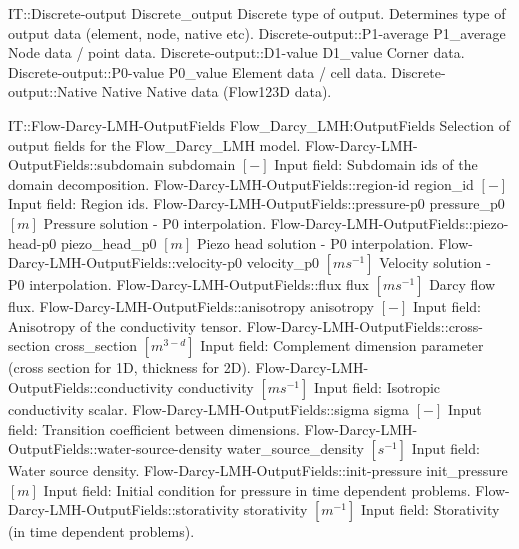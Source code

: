 \begin{SelectionType}
	{IT::Discrete-output}
	{Discrete{\_}output}
	{{{Discrete type of output.
Determines type of output data (element, node, native etc).}%
}}
		\SelectionItem
			{Discrete-output::P1-average}
			{P1{\_}average}
			{{{Node data / point data.}%
}}
		\SelectionItem
			{Discrete-output::D1-value}
			{D1{\_}value}
			{{{Corner data.}%
}}
		\SelectionItem
			{Discrete-output::P0-value}
			{P0{\_}value}
			{{{Element data / cell data.}%
}}
		\SelectionItem
			{Discrete-output::Native}
			{Native}
			{{{Native data (Flow123D data).}%
}}
\end{SelectionType}
\begin{SelectionType}
	{IT::Flow-Darcy-LMH-OutputFields}
	{Flow{\_}Darcy{\_}LMH:OutputFields}
	{{{Selection of output fields for the Flow{\_}Darcy{\_}LMH model.}%
}}
		\SelectionItem
			{Flow-Darcy-LMH-OutputFields::subdomain}
			{subdomain}
			{{{}{$[-]$}{ Input field: Subdomain ids of the domain decomposition.}%
}}
		\SelectionItem
			{Flow-Darcy-LMH-OutputFields::region-id}
			{region{\_}id}
			{{{}{$[-]$}{ Input field: Region ids.}%
}}
		\SelectionItem
			{Flow-Darcy-LMH-OutputFields::pressure-p0}
			{pressure{\_}p0}
			{{{}{$[m]$}{ Pressure solution - P0 interpolation.}%
}}
		\SelectionItem
			{Flow-Darcy-LMH-OutputFields::piezo-head-p0}
			{piezo{\_}head{\_}p0}
			{{{}{$[m]$}{ Piezo head solution - P0 interpolation.}%
}}
		\SelectionItem
			{Flow-Darcy-LMH-OutputFields::velocity-p0}
			{velocity{\_}p0}
			{{{}{$[ms^{-1}]$}{ Velocity solution - P0 interpolation.}%
}}
		\SelectionItem
			{Flow-Darcy-LMH-OutputFields::flux}
			{flux}
			{{{}{$[ms^{-1}]$}{ Darcy flow flux.}%
}}
		\SelectionItem
			{Flow-Darcy-LMH-OutputFields::anisotropy}
			{anisotropy}
			{{{}{$[-]$}{ Input field: Anisotropy of the conductivity tensor.}%
}}
		\SelectionItem
			{Flow-Darcy-LMH-OutputFields::cross-section}
			{cross{\_}section}
			{{{}{$[m^{3-d}]$}{ Input field: Complement dimension parameter (cross section for 1D, thickness for 2D).}%
}}
		\SelectionItem
			{Flow-Darcy-LMH-OutputFields::conductivity}
			{conductivity}
			{{{}{$[ms^{-1}]$}{ Input field: Isotropic conductivity scalar.}%
}}
		\SelectionItem
			{Flow-Darcy-LMH-OutputFields::sigma}
			{sigma}
			{{{}{$[-]$}{ Input field: Transition coefficient between dimensions.}%
}}
		\SelectionItem
			{Flow-Darcy-LMH-OutputFields::water-source-density}
			{water{\_}source{\_}density}
			{{{}{$[s^{-1}]$}{ Input field: Water source density.}%
}}
		\SelectionItem
			{Flow-Darcy-LMH-OutputFields::init-pressure}
			{init{\_}pressure}
			{{{}{$[m]$}{ Input field: Initial condition for pressure in time dependent problems.}%
}}
		\SelectionItem
			{Flow-Darcy-LMH-OutputFields::storativity}
			{storativity}
			{{{}{$[m^{-1}]$}{ Input field: Storativity (in time dependent problems).}%
}}
\end{SelectionType}
